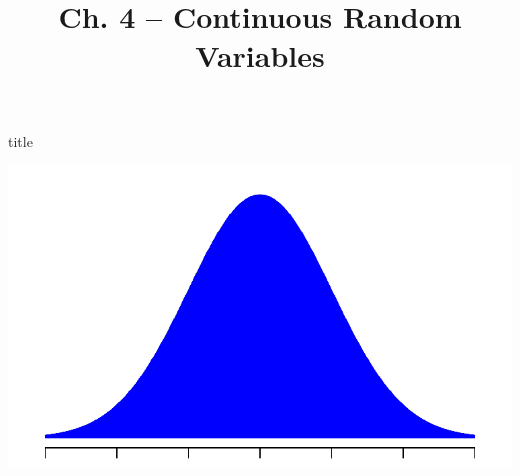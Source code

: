 \documentclass[handout]{beamer}
\title{Ch. 4 -- Continuous Random Variables}
\renewcommand{\emph}{\textbf}
\begin{document}
\begin{frame}
\begin{beamercolorbox}[rounded=true,wd=\textwidth,center]{title}
\inserttitle
\end{beamercolorbox}
\begin{center}
\includegraphics[scale=.7]{ch4_cdf_norm3.pdf}
\end{center}
\end{frame} 

%
%
\end{document}

